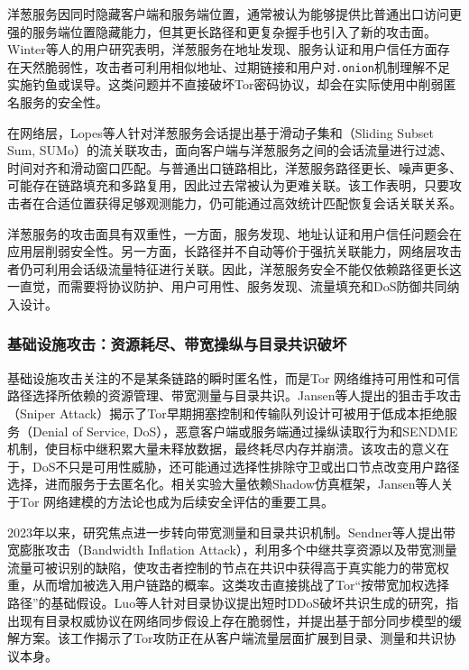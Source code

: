 洋葱服务因同时隐藏客户端和服务端位置，通常被认为能够提供比普通出口访问更强的服务端位置隐藏能力，但其更长路径和更复杂握手也引入了新的攻击面。Winter等人的用户研究表明，洋葱服务在地址发现、服务认证和用户信任方面存在天然脆弱性，攻击者可利用相似地址、过期链接和用户对\texttt{.onion}机制理解不足实施钓鱼或误导\cite{winter2018tor}。这类问题并不直接破坏Tor密码协议，却会在实际使用中削弱匿名服务的安全性。

在网络层，Lopes等人针对洋葱服务会话提出基于滑动子集和（Sliding Subset Sum, SUMo）的流关联攻击，面向客户端与洋葱服务之间的会话流量进行过滤、时间对齐和滑动窗口匹配\cite{lopes2024flow}。与普通出口链路相比，洋葱服务路径更长、噪声更多、可能存在链路填充和多路复用，因此过去常被认为更难关联。该工作表明，只要攻击者在合适位置获得足够观测能力，仍可能通过高效统计匹配恢复会话关联关系。

洋葱服务的攻击面具有双重性，一方面，服务发现、地址认证和用户信任问题会在应用层削弱安全性。另一方面，长路径并不自动等价于强抗关联能力，网络层攻击者仍可利用会话级流量特征进行关联。因此，洋葱服务安全不能仅依赖路径更长这一直觉，而需要将协议防护、用户可用性、服务发现、流量填充和DoS防御共同纳入设计。

\subsubsection{基础设施攻击：资源耗尽、带宽操纵与目录共识破坏}

基础设施攻击关注的不是某条链路的瞬时匿名性，而是Tor 网络维持可用性和可信路径选择所依赖的资源管理、带宽测量与目录共识。Jansen等人提出的狙击手攻击（Sniper Attack）揭示了Tor早期拥塞控制和传输队列设计可被用于低成本拒绝服务（Denial of Service, DoS），恶意客户端或服务端通过操纵读取行为和SENDME机制，使目标中继积累大量未释放数据，最终耗尽内存并崩溃\cite{jansen2014sniper}。该攻击的意义在于，DoS不只是可用性威胁，还可能通过选择性排除守卫或出口节点改变用户路径选择，进而服务于去匿名化。相关实验大量依赖Shadow仿真框架，Jansen等人关于Tor 网络建模的方法论也成为后续安全评估的重要工具\cite{jansen2012methodically}。

2023年以来，研究焦点进一步转向带宽测量和目录共识机制。Sendner等人提出带宽膨胀攻击（Bandwidth Inflation Attack），利用多个中继共享资源以及带宽测量流量可被识别的缺陷，使攻击者控制的节点在共识中获得高于真实能力的带宽权重，从而增加被选入用户链路的概率\cite{sendner2024mirageflow}。这类攻击直接挑战了Tor“按带宽加权选择路径”的基础假设。Luo等人针对目录协议提出短时DDoS破坏共识生成的研究，指出现有目录权威协议在网络同步假设上存在脆弱性，并提出基于部分同步模型的缓解方案\cite{luo2026five}。该工作揭示了Tor攻防正在从客户端流量层面扩展到目录、测量和共识协议本身。

